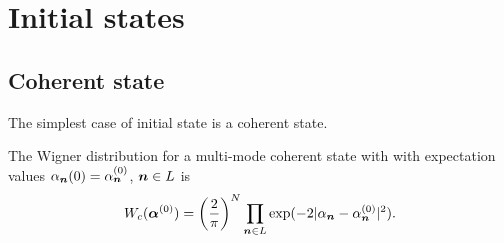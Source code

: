 \section{Initial states}

\subsection{Coherent state}

The simplest case of initial state is a coherent state.

\begin{theorem}
The Wigner distribution for a multi-mode coherent state with with expectation values
$\alpha_{\boldsymbol{n}}(0) = \alpha_{\boldsymbol{n}}^{(0)}$, $\boldsymbol{n} \in L$ is
\[
	W_c (\bm{\alpha}^{(0)})
	= \left( \frac{2}{\pi} \right)^N \prod_{\boldsymbol{n} \in L}
		\exp(-2 |\alpha_{\boldsymbol{n}} - \alpha_{\boldsymbol{n}}^{(0)}|^2).
\]
\end{theorem}
